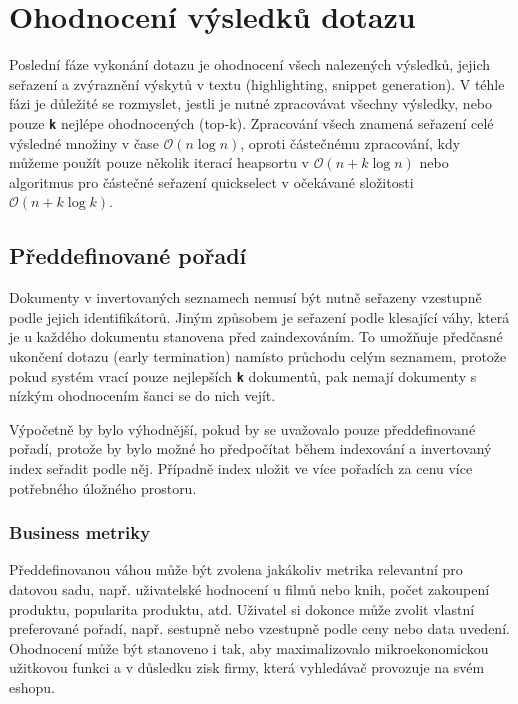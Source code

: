 \documentclass[11pt,letterpaper,oneside,openright]{book}
\newcommand{\bftt}[1]{\texttt{\textbf{#1}}}
\begin{document}

\section{Ohodnocení výsledků dotazu} \label{sec:ohodnoceni_vysledku}
Poslední fáze vykonání dotazu je ohodnocení všech nalezených výsledků, jejich
seřazení a zvýraznění výskytů v textu (highlighting, snippet generation). V
téhle fázi je důležité se rozmyslet, jestli je nutné zpracovávat všechny
výsledky, nebo pouze \bftt{k} nejlépe ohodnocených (top-k). Zpracování všech
znamená seřazení celé výsledné množiny v čase $\mathcal{O}(n \log n)$, oproti
částečnému zpracování, kdy můžeme použít pouze několik iterací heapsortu v
$\mathcal{O}(n + k \log n)$ nebo algoritmus pro částečné seřazení quickselect v
očekávané složitosti $\mathcal{O}(n + k \log k)$.

\subsection{Předdefinované pořadí}
Dokumenty v invertovaných seznamech nemusí být nutně seřazeny vzestupně podle
jejich identifikátorů. Jiným způsobem je seřazení podle klesající váhy, která
je u každého dokumentu stanovena před zaindexováním. To umožňuje předčasné
ukončení dotazu (early termination) namísto průchodu celým seznamem, protože
pokud systém vrací pouze nejlepších \bftt{k} dokumentů, pak nemají dokumenty s
nízkým ohodnocením šanci se do nich vejít.

Výpočetně by bylo výhodnější, pokud by se uvažovalo pouze předdefinované
pořadí, protože by bylo možné ho předpočítat během indexování a invertovaný
index seřadit podle něj. Případně index uložit ve více pořadích za cenu více
potřebného úložného prostoru.

\subsubsection{Business metriky}
Předdefinovanou váhou může být zvolena jakákoliv metrika relevantní pro datovou
sadu, např. uživatelské hodnocení u filmů nebo knih, počet zakoupení produktu,
popularita produktu, atd. Uživatel si dokonce může zvolit vlastní preferované
pořadí, např. sestupně nebo vzestupně podle ceny nebo data uvedení. Ohodnocení
může být stanoveno i tak, aby maximalizovalo mikroekonomickou užitkovou funkci
a v důsledku zisk firmy, která vyhledávač provozuje na svém eshopu.

\end{document}
